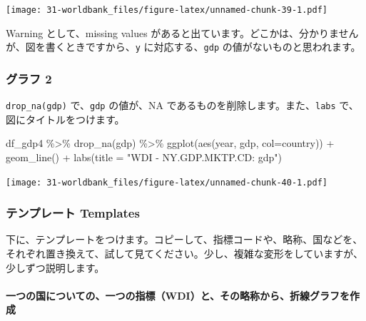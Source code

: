 \documentclass[
]{bxjsbook}
\newenvironment{Shaded}{\begin{snugshade}}{\end{snugshade}}
\newcommand{\AttributeTok}[1]{\textcolor[rgb]{0.77,0.63,0.00}{#1}}
\newcommand{\FunctionTok}[1]{\textcolor[rgb]{0.00,0.00,0.00}{#1}}
\newcommand{\NormalTok}[1]{#1}
\newcommand{\SpecialCharTok}[1]{\textcolor[rgb]{0.00,0.00,0.00}{#1}}
\newcommand{\StringTok}[1]{\textcolor[rgb]{0.31,0.60,0.02}{#1}}
\theoremstyle{definition}
\theoremstyle{definition}
\theoremstyle{definition}
\theoremstyle{definition}
\theoremstyle{remark}
\begin{document}
\texttt{[image: 31-worldbank\_files/figure-latex/unnamed-chunk-39-1.pdf]}

Warning として、missing values があると出ています。どこかは、分かりませんが、図を書くときですから、\texttt{y} に対応する、\texttt{gdp} の値がないものと思われます。

\hypertarget{ux30b0ux30e9ux30d5-2}{%
\subsubsection{グラフ 2}\label{ux30b0ux30e9ux30d5-2}}

\texttt{drop\_na(gdp)} で、\texttt{gdp} の値が、NA であるものを削除します。また、\texttt{labs} で、図にタイトルをつけます。

\begin{Shaded}
\begin{Highlighting}[]
\NormalTok{df\_gdp4 }\SpecialCharTok{\%\textgreater{}\%} \FunctionTok{drop\_na}\NormalTok{(gdp) }\SpecialCharTok{\%\textgreater{}\%} 
  \FunctionTok{ggplot}\NormalTok{(}\FunctionTok{aes}\NormalTok{(year, gdp, }\AttributeTok{col=}\NormalTok{country)) }\SpecialCharTok{+} \FunctionTok{geom\_line}\NormalTok{() }\SpecialCharTok{+}
  \FunctionTok{labs}\NormalTok{(}\AttributeTok{title =} \StringTok{"WDI {-} NY.GDP.MKTP.CD: gdp"}\NormalTok{)}
\end{Highlighting}
\end{Shaded}

\texttt{[image: 31-worldbank\_files/figure-latex/unnamed-chunk-40-1.pdf]}

\hypertarget{ux30c6ux30f3ux30d7ux30ecux30fcux30c8-templates}{%
\subsubsection{テンプレート Templates}\label{ux30c6ux30f3ux30d7ux30ecux30fcux30c8-templates}}

下に、テンプレートをつけます。コピーして、指標コードや、略称、国などを、それぞれ置き換えて、試して見てください。少し、複雑な変形をしていますが、少しずつ説明します。

\hypertarget{ux4e00ux3064ux306eux56fdux306bux3064ux3044ux3066ux306eux4e00ux3064ux306eux6307ux6a19wdiux3068ux305dux306eux7565ux79f0ux304bux3089ux6298ux7ddaux30b0ux30e9ux30d5ux3092ux4f5cux6210}{%
\paragraph{一つの国についての、一つの指標（WDI）と、その略称から、折線グラフを作成}\label{ux4e00ux3064ux306eux56fdux306bux3064ux3044ux3066ux306eux4e00ux3064ux306eux6307ux6a19wdiux3068ux305dux306eux7565ux79f0ux304bux3089ux6298ux7ddaux30b0ux30e9ux30d5ux3092ux4f5cux6210}}
\end{document}
